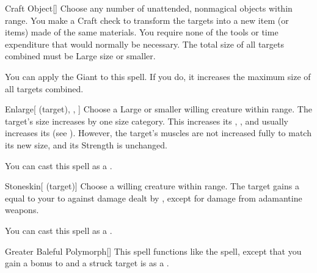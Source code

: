 \lowercase{\hypertarget{spell:Craft Object}{}}\label{spell:Craft Object}
\begin{apability}[\nth{3}]{\hypertarget{spell:Craft Object}{Craft Object}}[]
Choose any number of unattended, nonmagical objects within \rngclose range.
You make a Craft check to transform the targets into a new item (or items) made of the same materials.
You require none of the tools or time expenditure that would normally be necessary.
The total size of all targets combined must be Large size or smaller.

You can apply the Giant  to this spell.
If you do, it increases the maximum size of all targets combined.
\end{apability}
\vspace{0.25em}



\lowercase{\hypertarget{spell:Enlarge}{}}\label{spell:Enlarge}
\begin{attuneability}[\nth{3}]{\hypertarget{spell:Enlarge}{Enlarge}}[ (target), , ]
Choose a Large or smaller willing creature within \rngclose range.
The target's size increases by one size category.
This increases its , , and usually increases its  (see ).
However, the target's muscles are not increased fully to match its new size, and its Strength is unchanged.

You can cast this spell as a .
\end{attuneability}
\vspace{0.25em}



\lowercase{\hypertarget{spell:Stoneskin}{}}\label{spell:Stoneskin}
\begin{attuneability}[\nth{3}]{\hypertarget{spell:Stoneskin}{Stoneskin}}[ (target)]
Choose a willing creature within \rngclose range.
The target gains a  equal to your  to  against damage dealt by , except for damage from adamantine weapons.

You can cast this spell as a .
\end{attuneability}
\vspace{0.25em}



\lowercase{\hypertarget{spell:Greater Baleful Polymorph}{}}\label{spell:Greater Baleful Polymorph}
\begin{apability}[\nth{4}]{\hypertarget{spell:Greater Baleful Polymorph}{Greater Baleful Polymorph}}[]
This spell functions like the  spell, except that you gain a  bonus to  and a struck target is  as a .
\end{apability}
\vspace{0.25em}



